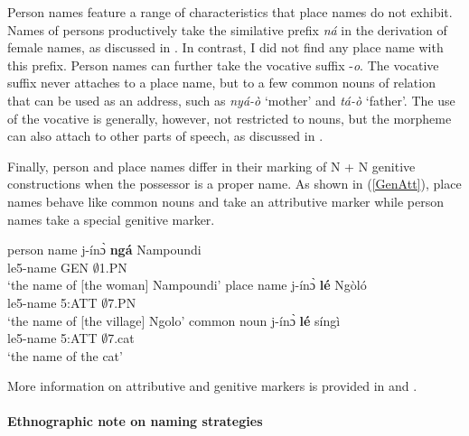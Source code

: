 Person names feature a range of characteristics that place names do not exhibit. Names of persons productively take the similative prefix {\itshape ná} in the derivation of female names, as discussed in . In contrast, I did not find any place name with this prefix. 
Person names can further take the vocative suffix -{\itshape o}. The vocative suffix never attaches to a place name, but to a few common nouns  of relation that can be used as an address, such as {\itshape nyá-ò} `mother' and {\itshape tá-ò} `father'. The use of the vocative is generally, however, not restricted to nouns, but the morpheme can also attach to other parts of speech, as discussed in .

Finally, person and place names differ in their marking of N + N genitive constructions when the possessor is a proper name. As shown in (\ref{GenAtt}), place names behave like common nouns and take an attributive marker while person names take a special genitive marker.


\begin{exe}
\ex\label{GenAtt} 
\begin{xlist}
\ex\label{GenAtt1} person name
\gll  j-ínɔ̀ {\bfseries ngá} Nampoundi \\
	le5-name GEN $\emptyset$1.PN \\
 \trans `the name of [the woman] Nampoundi'
\ex\label{GenAtt2} place name
\gll j-ínɔ̀ {\bfseries lé} Ngòló \\
    le5-name 5:ATT $\emptyset$7.PN	\\
 \trans `the name of [the village] Ngolo'
\ex\label{GenAtt3} common noun
\gll  j-ínɔ̀ {\bfseries lé} síngì \\
	le5-name 5:ATT $\emptyset$7.cat \\
 \trans `the name of the cat'
\end{xlist}
\end{exe}

\noindent  More information on attributive and genitive markers is provided in  and . 





\paragraph{Ethnographic note on naming strategies}

